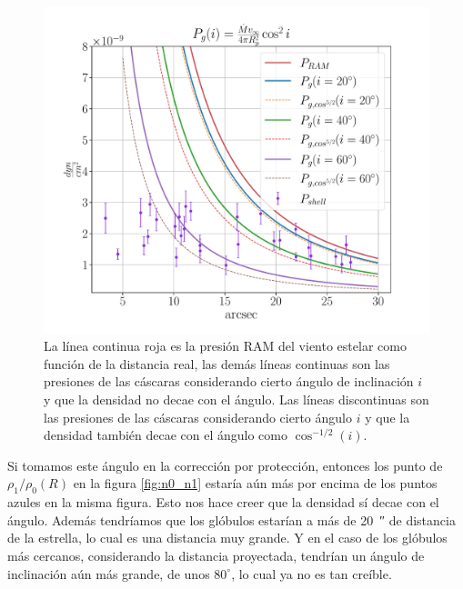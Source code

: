 \documentclass{book}
\begin{document}
\begin{figure}[htb]
    \centering
    \includegraphics[width=\textwidth]{Nuevas imagenes finales/R_1_cos2.pdf}
    \caption{La línea continua roja es la presión RAM del viento estelar como función de la distancia real, las demás líneas continuas son las presiones de las cáscaras considerando cierto ángulo de inclinación $i$ y que la densidad no decae con el ángulo. Las líneas discontinuas son las presiones de las cáscaras considerando cierto ángulo $i$ y que la densidad también decae con el ángulo como $\cos^{-1/2}(i)$.}
    \label{fig:ncos_2}
\end{figure}

Si tomamos este ángulo en la corrección por protección, entonces los punto de $\rho_1/\rho_0(R)$ en la figura \ref{fig:n0_n1} estaría aún más por encima de los puntos azules en la misma figura. Esto nos hace creer que la densidad sí decae con el ángulo. Además tendríamos que los glóbulos estarían a más de \SI{20}{\arcsecond} de distancia de la estrella, lo cual es una distancia muy grande. Y en el caso de los glóbulos más cercanos, considerando la distancia proyectada, tendrían un ángulo de inclinación aún más grande, de unos $80^\circ$, lo cual ya no es tan creíble.
\end{document}
